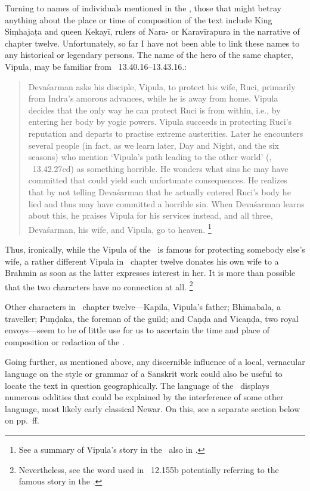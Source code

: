 Turning to names of individuals mentioned in the \VSS,
those that might betray anything about the place or
time of composition of the text include King Siṃhajaṭa
and queen Kekayī, rulers of Nara- or Karavīrapura
in the narrative of chapter twelve. Unfortunately,
so far I have not been able to link these names to
any historical or legendary persons. The name of the
hero of the same chapter, Vipula,\label{Vipula} may be familiar 
from \MBH\ 13.40.16--13.43.16.: 

\begin{quote}
Devaśarman asks his disciple,
Vipula, to protect his wife, Ruci, primarily from Indra's
amorous advances, while he is away from home.
Vipula decides that the only way he can protect Ruci
is from within, i.e., by entering her body by yogic powers.
Vipula succeeds in protecting Ruci's reputation and 
departs to practise extreme austerities. Later he 
encounters several people (in fact,
as we learn later, Day and Night,
and the six seasons) who mention `Vipula's path leading to
the other world' (, 
\MBH\ 13.42.27cd) as something horrible. He 
wonders what sins he may have committed that
could yield such unfortunate consequences. He
realizes that by not telling Devaśarman that he
actually entered Ruci's body he lied and thus
may have committed a horrible sin. When Devaśarman learns
about this, he praises Vipula for his services instead, 
and all three, Devaśarman, his wife, and Vipula,
go to heaven.%
		\footnote{See a summary of Vipula's story in the 
			\MBH\ also in 
			.}
\end{quote}

\noindent
Thus, ironically, while the Vipula of the \MBH\ is famous
for protecting somebody else's wife,  
a rather different Vipula
in \VSS\ chapter twelve donates
his own wife to a Brahmin as soon as the latter expresses
interest in her. It is more than possible that
the two characters have no connection at all.%
	\footnote{Nevertheless, see the word  used
	in \VSS\ 12.155b potentially referring to the famous
	story in the \MBh.}

Other characters in \VSS\ chapter twelve---Kapila, 
Vipula's father;
Bhīmabala, a traveller; Puṇḍaka, the foreman of the guild;
and Caṇḍa and Vicaṇḍa, two royal envoys---seem 
to be of little use for us to ascertain the time and place of composition or redaction of the \VSS. 

Going further, as mentioned above, any discernible influence
of a local, vernacular language on the style or grammar of
a Sanskrit work could also be useful to
locate the text in question geographically. 
The language of the \VSS\
displays numerous oddities that could be
explained by the interference of some other 
language, most likely early classical Newar.
On this, see a separate section below on 
pp.~\pageref{newar}ff.


